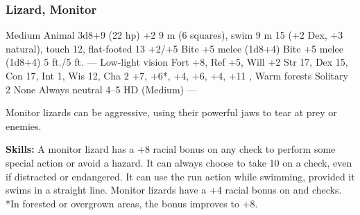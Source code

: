 \subsubsection{Lizard, Monitor}
\begin{MonsterStats}
{Medium Animal}
{3d8+9 (22 hp)}
{+2}
{9 m (6 squares), swim 9 m}
{15 (+2 Dex, +3 natural), touch 12, flat-footed 13}
{+2/+5}
{Bite +5 melee (1d8+4)}
{Bite +5 melee (1d8+4)}
{5 ft./5 ft.}
{—}
{Low-light vision}
{Fort +8, Ref +5, Will +2}
{Str 17, Dex 15, Con 17, Int 1, Wis 12, Cha 2}
{ +7,  +6*,  +4,  +6,  +4,  +11}
{, }
{Warm forests}
{Solitary}
{2}
{None}
{Always neutral}
{4--5 HD (Medium)}
{---}
\end{MonsterStats}


Monitor lizards can be aggressive, using their powerful jaws to tear at prey or enemies.

\textbf{Skills:} A monitor lizard has a +8 racial bonus on any  check to perform some special action or avoid a hazard. It can always choose to take 10 on a  check, even if distracted or endangered. It can use the run action while swimming, provided it swims in a straight line. Monitor lizards have a +4 racial bonus on  and  checks. *In forested or overgrown areas, the  bonus improves to +8.

